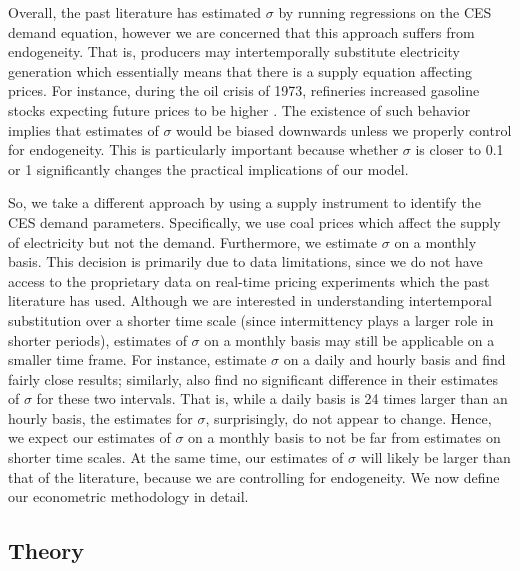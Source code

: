 \documentclass[11pt,a4paper]{extarticle}
\begin{document}
Overall, the past literature has estimated $\sigma$ by running regressions on the CES demand equation, however we are concerned that this approach suffers from endogeneity. That is, producers may intertemporally substitute electricity generation which essentially means that there is a supply equation affecting prices. For instance, during the oil crisis of 1973, refineries increased gasoline stocks expecting future prices to be higher \citep{genie}. The existence of such behavior implies that estimates of $\sigma$ would be biased downwards unless we properly control for endogeneity. This is particularly important because whether $\sigma$ is closer to 0.1 or 1 significantly changes the practical implications of our model. 

So, we take a different approach by using a supply instrument to identify the CES demand parameters. Specifically, we use coal prices which affect the supply of electricity but not the demand. Furthermore, we estimate $\sigma$ on a monthly basis. This decision is primarily due to data limitations, since we do  not have access to the proprietary data on real-time pricing experiments which the past literature has used. Although we are interested in understanding intertemporal substitution over a shorter time scale (since intermittency plays a larger role in shorter periods), estimates of $\sigma$ on a monthly basis may still be applicable on a smaller time frame. For instance, \citet{Schwarz} estimate $\sigma$ on a daily and hourly basis and find fairly close results; similarly, \citet{Herriges} also find no significant difference in their estimates of $\sigma$ for these two intervals. That is, while a daily basis is 24 times larger than an hourly basis, the estimates for $\sigma$, surprisingly, do not appear to change. Hence, we expect our estimates of $\sigma$ on a monthly basis to not be far from estimates on shorter time scales. At the same time, our estimates of $\sigma$ will likely be larger than that of the literature, because we are controlling for endogeneity. We now define our econometric methodology in detail.

\subsection{Theory}
\end{document}
